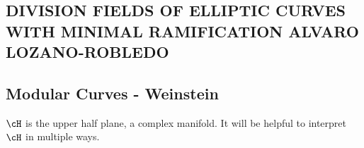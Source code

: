 
















































































\subsection{DIVISION FIELDS OF ELLIPTIC CURVES WITH MINIMAL RAMIFICATION ALVARO LOZANO-ROBLEDO}

\subsection{Modular Curves - Weinstein}

$\cH$ is the upper half plane, a complex manifold. It will be helpful to interpret $\cH$ in multiple ways.

